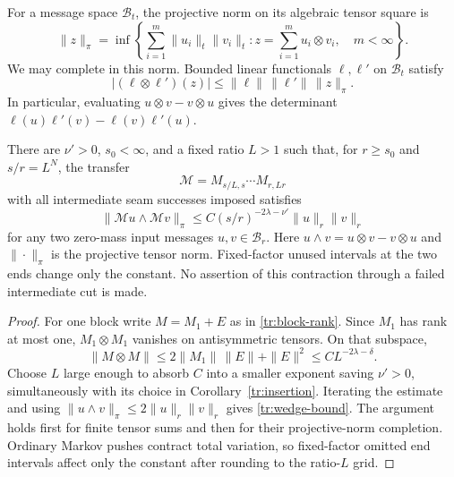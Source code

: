 For a message space $\mathcal B_t$, the projective norm on its algebraic
tensor square is
\[
 \|z\|_\pi
   =\inf\left\{\sum_{i=1}^m\|u_i\|_t\|v_i\|_t:
          z=\sum_{i=1}^m u_i\otimes v_i,\quad m<\infty\right\}.
\]
We may complete in this norm.  Bounded linear functionals $\ell,\ell'$
on $\mathcal B_t$ satisfy
\[
         |(\ell\otimes\ell')(z)|
                \le\|\ell\|\,\|\ell'\|\,\|z\|_\pi.
\]
In particular, evaluating $u\otimes v-v\otimes u$ gives the determinant
$\ell(u)\ell'(v)-\ell(v)\ell'(u)$.

\begin{corollary}
\label{tr:wedge}
There are $\nu'>0$, $s_0<\infty$, and a fixed ratio $L>1$ such that,
for $r\ge s_0$ and $s/r=L^N$, the transfer
\[
          \mathcal M=M_{s/L,s}\cdots M_{r,Lr}
\]
with all intermediate seam successes imposed satisfies
\begin{equation}
 \|\mathcal M u\wedge\mathcal M v\|_\pi
       \le C(s/r)^{-2\lambda-\nu'}\|u\|_r\|v\|_r
\label{tr:wedge-bound}
\end{equation}
for any two zero-mass input messages $u,v\in\mathcal B_r$.  Here
$u\wedge v=u\otimes v-v\otimes u$ and $\|\cdot\|_\pi$ is the
projective tensor norm.  Fixed-factor unused intervals at the two
ends change only the constant.  No assertion of this contraction
through a failed intermediate cut is made.
\end{corollary}

\begin{proof}
For one block write $M=M_1+E$ as in
\eqref{tr:block-rank}.  Since $M_1$ has rank at most one,
$M_1\otimes M_1$ vanishes on antisymmetric tensors.  On that subspace,
\[
 \|M\otimes M\|
        \le 2\|M_1\|\,\|E\|+\|E\|^2
        \le C L^{-2\lambda-\delta}.
\]
Choose $L$ large enough to absorb $C$ into a smaller exponent saving
$\nu'>0$, simultaneously with its choice in
Corollary~\ref{tr:insertion}.  Iterating the estimate and using
$\|u\wedge v\|_\pi\le2\|u\|_r\|v\|_r$ gives
\eqref{tr:wedge-bound}.  The argument holds first for finite tensor
sums and then for their projective-norm completion.  Ordinary
Markov pushes contract total variation, so fixed-factor omitted end
intervals affect only the constant after rounding to the ratio-$L$
grid.
\end{proof}
